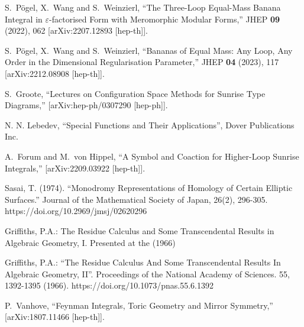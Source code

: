 \documentclass[a4paper,12pt]{article}
\numberwithin{equation}{section}
\numberwithin{figure}{subsection}
\theoremstyle{plain}
\theoremstyle{plain}
\theoremstyle{definition}
\theoremstyle{plain}
\theoremstyle{remark}
\theoremstyle{plain}
\begin{document}
\begin{thebibliography}{99}
S.~P\"ogel, X.~Wang and S.~Weinzierl,
``The Three-Loop Equal-Mass Banana Integral in \ensuremath{\varepsilon}-factorised Form with Meromorphic Modular Forms,''
JHEP \textbf{09} (2022), 062
[arXiv:2207.12893 [hep-th]].

S.~P\"ogel, X.~Wang and S.~Weinzierl,
``Bananas of Equal Mass: Any Loop, Any Order in the Dimensional Regularisation Parameter,''
JHEP \textbf{04} (2023), 117
[arXiv:2212.08908 [hep-th]].

S.~Groote,
``Lectures on Configuration Space Methods for Sunrise Type Diagrams,''
[arXiv:hep-ph/0307290 [hep-ph]].
  
 N. N. Lebedev, ``Special Functions and Their
  Applications'', Dover Publications Inc. 

A.~Forum and M.~von Hippel,
``A Symbol and Coaction for Higher-Loop Sunrise Integrals,''
[arXiv:2209.03922 [hep-th]].

 Sasai, T. (1974). ``Monodromy Representations of
  Homology of Certain Elliptic Surfaces.'' Journal of the Mathematical
  Society of Japan, 26(2),
  296-305. https://doi.org/10.2969/jmsj/02620296

   Griffiths, P.A.: The Residue Calculus and Some
    Transcendental Results in Algebraic Geometry, I. Presented at the
    (1966)

    Griffiths, P.A.: ``The Residue Calculus And Some Transcendental
    Results In Algebraic Geometry, II''. Proceedings of the National
    Academy of Sciences. 55, 1392-1395
    (1966). https://doi.org/10.1073/pnas.55.6.1392 
  
P.~Vanhove,
``Feynman Integrals, Toric Geometry and Mirror Symmetry,''
[arXiv:1807.11466 [hep-th]].

\end{thebibliography}
\end{document}
